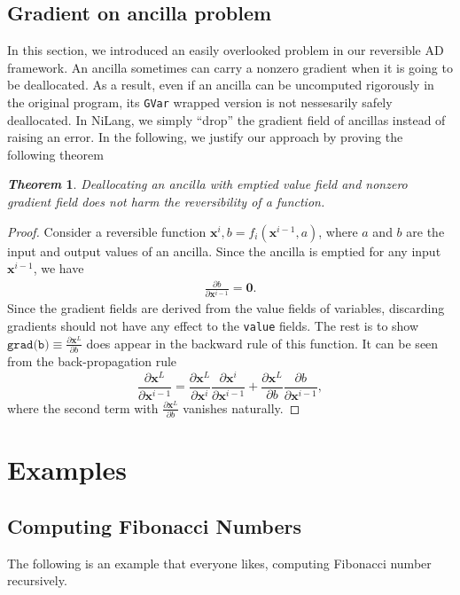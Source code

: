 \documentclass[aps,twocolumn,longbibliography,english,superscriptaddress]{revtex4-1}
\newcommand{\<}{\langle}
\renewcommand{\>}{\rangle}
\newcommand{\vx}{{\mathbf{x}}}
\newtheorem{theorem}{\textit{Theorem}}
\theoremstyle{definition}\newtheorem{definition}{\textit{Definition}}
\begin{document}
\subsection{Gradient on ancilla problem}
In this section, we introduced an easily overlooked problem in our reversible AD framework.
An ancilla sometimes can carry a nonzero gradient when it is going to be deallocated. As a result, even if an ancilla can be uncomputed rigorously in the original program, its \texttt{GVar} wrapped version is not nessesarily safely deallocated.
In NiLang, we simply ``drop'' the gradient field of ancillas instead of raising an error.
In the following, we justify our approach by proving the following theorem
\begin{theorem}
    Deallocating an ancilla with emptied value field and nonzero gradient field does not harm the reversibility of a function.
\end{theorem}
\begin{proof}
    Consider a reversible function $\vx^i, b = f_i(\vx^{i-1}, a)$, where $a$ and $b$ are the input and output values of an ancilla. Since the ancilla is emptied for any input $\vx^{i-1}$, we have
\begin{align}
    \frac{\partial b}{\partial \vx^{i-1}} = \mathbf{0}.
\end{align}
Since the gradient fields are derived from the value fields of variables, discarding gradients should not have any effect to the \texttt{value} fields.
    The rest is to show $\texttt{grad(b)} \equiv \frac{\partial \vx^L}{\partial{b}}$ does appear in the backward rule of this function. It can be seen from the back-propagation rule 
\begin{equation}
    \frac{\partial \vx^L}{\partial \vx^{i-1}} = \frac{\partial \vx^L}{\partial \vx^i}\frac{\partial \vx^i}{\partial \vx^{i-1}} + \frac{\partial \vx^L}{\partial b}\frac{\partial b}{\partial \vx^{i-1}},
\end{equation}
where the second term with $\frac{\partial \vx^L}{\partial{b}}$ vanishes naturally.
\end{proof}

\section{Examples}\label{sec:example}

\subsection{Computing Fibonacci Numbers}\label{sec:fib}
The following is an example that everyone likes, computing Fibonacci number recursively.
\end{document}
